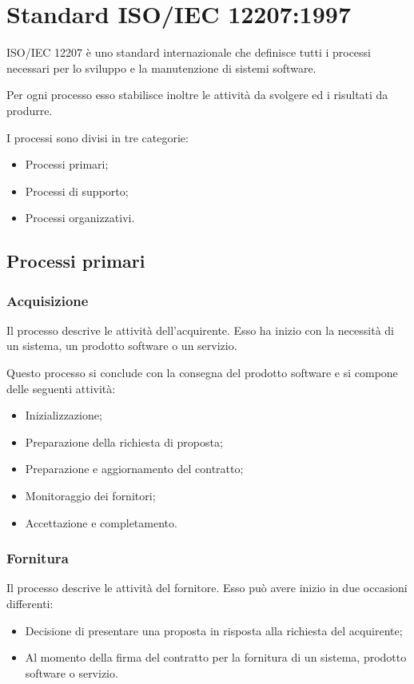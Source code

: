 \chapter{Standard ISO/IEC 12207:1997}\label{appendice-iso}
ISO/IEC 12207 è uno standard internazionale che definisce tutti i processi necessari per lo sviluppo e la manutenzione di sistemi software.

Per ogni processo esso stabilisce inoltre le attività da svolgere ed i risultati da produrre.

I processi sono divisi in tre categorie:
\begin{itemize}
    \item Processi primari;
    \item Processi di supporto;
    \item Processi organizzativi.
\end{itemize}

\section{Processi primari}

\subsection{Acquisizione}
Il processo descrive le attività dell'acquirente. Esso ha inizio con la necessità di un sistema, un prodotto software o un servizio.

Questo processo si conclude con la consegna del prodotto software e si compone delle seguenti attività:
\begin{itemize}
    \item Inizializzazione;
    \item Preparazione della richiesta di proposta;
    \item Preparazione e aggiornamento del contratto;
    \item Monitoraggio dei fornitori;
    \item Accettazione e completamento.
\end{itemize}

\subsection{Fornitura}

Il processo descrive le attività del fornitore. Esso può avere inizio in due occasioni differenti:

\begin{itemize}
    \item Decisione di presentare una proposta in risposta alla richiesta del acquirente;
    \item Al momento della firma del contratto per la fornitura di un sistema, prodotto software o servizio.
\end{itemize}


